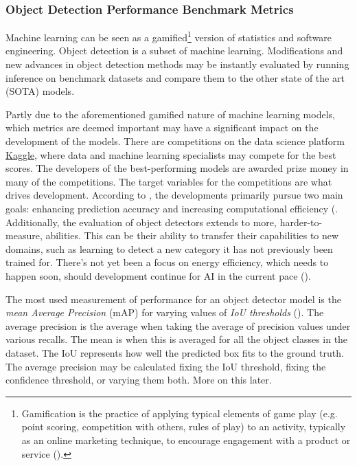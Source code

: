 \subsubsection{Object Detection Performance Benchmark Metrics}
\label{sec:accuracy_of_model_inferences}
Machine learning can be seen as a gamified\footnote{Gamification is the practice of applying typical elements of game play (e.g. point scoring, competition with others, rules of play) to an activity, typically as an online marketing technique, to encourage engagement with a product or service (\cite{ox2023gamification}).} version of statistics and software engineering. Object detection is a subset of machine learning. Modifications and new advances in object detection methods may be instantly evaluated by running inference on benchmark datasets and compare them to the other state of the art (SOTA) models.

Partly due to the aforementioned gamified nature of machine learning models, which metrics are deemed important may have a significant impact on the development of the models. There are competitions on the data science platform \href{https://kaggle.com}{Kaggle}, where data and machine learning specialists may compete for the best scores. The developers of the best-performing models are awarded prize money in many of the competitions. The target variables for the competitions are what drives development. According to \citeauthor{zou2023object_detection_in_20_years}, the developments primarily pursue two main goals: enhancing prediction accuracy and increasing computational efficiency (\citeyear{zou2023object_detection_in_20_years}. Additionally, the evaluation of object detectors extends to more, harder-to-measure, abilities. This can be their ability to transfer their capabilities to new domains, such as learning to detect a new category it has not previously been trained for. There's not yet been a focus on energy efficiency, which needs to happen soon, should development continue for AI in the current pace (\cite{lu2023AIenergyefficieny}).

The most used measurement of performance for an object detector model is the \textit{mean Average Precision} (mAP) for varying values of \textit{IoU thresholds} (\cite{zou2023object_detection_in_20_years}). The average precision is the average when taking the average of precision values under various recalls. The mean is when this is averaged for all the object classes in the dataset. The IoU represents how well the predicted box fits to the ground truth. The average precision may be calculated fixing the IoU threshold, fixing the confidence threshold, or varying them both. More on this later.

